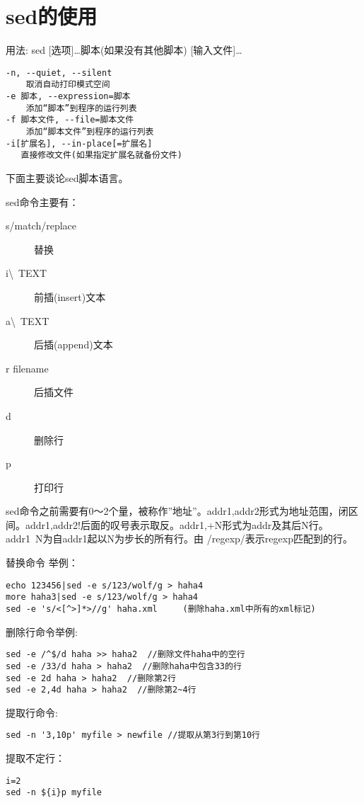 \section{sed的使用}

用法: sed [选项]\ldots {脚本(如果没有其他脚本)} [输入文件]\ldots

\begin{verbatim}
-n, --quiet, --silent
    取消自动打印模式空间
-e 脚本, --expression=脚本
    添加“脚本”到程序的运行列表
-f 脚本文件, --file=脚本文件
    添加“脚本文件”到程序的运行列表
-i[扩展名], --in-place[=扩展名]
   直接修改文件(如果指定扩展名就备份文件)
\end{verbatim}

下面主要谈论sed脚本语言。


sed命令主要有：
\begin{description}
    \item[s/match/replace]替换
    \item[i\textbackslash\ TEXT]前插(insert)文本
    \item[a\textbackslash\ TEXT]后插(append)文本
    \item[r filename]后插文件
    \item[d]删除行
    \item[p]打印行
\end{description}

sed命令之前需要有0～2个量，被称作''地址''。addr1,addr2形式为地址范围，闭区间。addr1,addr2!后面的叹号表示取反。addr1,+N形式为addr及其后N行。addr1~N为自addr1起以N为步长的所有行。由 /regexp/表示regexp匹配到的行。

替换命令 举例：
\begin{verbatim}
echo 123456|sed -e s/123/wolf/g > haha4
more haha3|sed -e s/123/wolf/g > haha4
sed -e 's/<[^>]*>//g' haha.xml     (删除haha.xml中所有的xml标记)
\end{verbatim}

删除行命令举例:
\begin{verbatim}
sed -e /^$/d haha >> haha2  //删除文件haha中的空行
sed -e /33/d haha > haha2  //删除haha中包含33的行
sed -e 2d haha > haha2  //删除第2行
sed -e 2,4d haha > haha2  //删除第2~4行
\end{verbatim}

提取行命令:
\begin{verbatim}
sed -n '3,10p' myfile > newfile //提取从第3行到第10行
\end{verbatim}

提取不定行：
\begin{verbatim}
i=2
sed -n ${i}p myfile
\end{verbatim}


